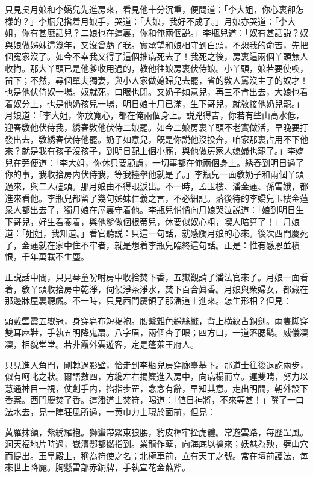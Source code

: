 只見吳月娘和李嬌兒先進房來，看見他十分沉重，便問道：「李大姐，你心裏卻怎樣的？」李瓶兒揝着月娘手，哭道：「大娘，我好不成了。」月娘亦哭道：「李大姐，你有甚麽話兒？二娘也在這裏，你和俺兩個説。」李瓶兒道：「奴有甚話説？奴與娘做姊妹這幾年，又沒曾虧了我。實承望和娘相守到白頭，不想我的命苦，先把個寃家沒了。如今不幸我又得了這個拙病死去了！我死之後，房裏這兩個丫頭無人收拘。那大丫頭已是他爹收用過的，教他往娘房裏伏侍娘。小丫頭，娘若要使喚，㽞下；不然，尋個單夫獨妻，與小人家做媳婦兒去罷，省的敎人罵沒主子的奴才！也是他伏侍奴一場。奴就死，口眼也閉。又奶子如意兒，再三不肯出去，大娘也看着奴分上，也是他奶孩兒一場，明日娘十月已滿，生下哥兒，就敎接他奶兒罷。」月娘道：「李大姐，你放寬心，都在俺兩個身上。説兇得吉，你若有些山高水低，迎春敎他伏侍我，綉春敎他伏侍二娘罷。如今二娘房裏丫頭不老實做活，早晚要打發出去，敎綉春伏侍他罷。奶子如意兒，旣是你説他沒投奔，咱家那裏占用不下他來？就是我有孩子沒孩子，到明日配上個小廝，與他做房家人媳婦也罷了。」李嬌兒在旁便道：「李大姐，你休只要顧慮，一切事都在俺兩個身上。綉春到明日過了你的事，我收拾房内伏侍我，等我擡擧他就是了。」李瓶兒一面敎奶子和兩個丫頭過來，與二人磕頭。那月娘由不得眼淚出。不一時，孟玉樓、潘金蓮、孫雪娥，都進來看他。李瓶兒都留了幾句姊妹仁義之言，不必細記。落後待的李嬌兒玉樓金蓮衆人都出去了，獨月娘在屋裏守着他。李瓶兒悄悄向月娘哭泣説道：「娘到明日生下哥兒，好生看養着，與他爹做個根蒂兒，休要似奴心粗，喫人暗算了！」月娘道：「姐姐，我知道。」看官聽説：只這一句話，就感觸月娘的心來。後次西門慶死了，金蓮就在家中住不牢者，就是想着李瓶兒臨終這句話。正是：惟有感恩並積恨，千年萬載不生塵。

正説話中間，只見琴童吩咐房中收拾焚下香，五嶽觀請了潘法官來了。月娘一面看着，敎丫頭收拾房中乾淨，伺候淨茶淨水，焚下百合眞香。月娘與衆婦女，都藏在那邊牀屋裏聽覷。不一時，只見西門慶領了那潘道士進來。怎生形相？但見：

\begin{myquote}
頭戴雲霞五嶽冠，身穿皂布短褐袍。腰繫雜色綵絲縧，背上横紋古銅劍。兩隻脚穿雙耳麻鞋，手執五明降鬼扇。八字眉，兩個杏子眼；四方口，一道落腮鬍。威儀凜凜，相貌堂堂。若非霞外雲遊客，定是蓬萊王府人。
\end{myquote}

只見進入角門，剛轉過影壁，恰走到李瓶兒房穿廊臺基下。那道士往後退訖兩步，似有呵叱之狀。爾語數四，方纔左右揭簾進入房中，向病榻而立。運雙睛，努力以慧通神目一視，仗劍手内，掐指步罡，念念有辭，早知其意。走出明間，朝外設下香案。西門慶焚了香。這潘道士焚符，喝道：「値日神將，不來等甚！」噀了一口法水去，見一陣狂風所過，一黄巾力士現於面前，但見：

\begin{myquote}
黄羅抹額，紫綉羅袍。獅蠻帶緊束狼腰，豹皮褌牢拴虎體。常遊雲路，每歷罡風。洞天福地片時過，嶽瀆酆都撚指到。業龍作孽，向海底以擒來；妖魅為殃，劈山穴而提出。玉皇殿上，稱為符使之名；北極車前，立有天丁之號。常在壇前護法，每來世上降魔。胸懸雷部赤銅牌，手執宣花金蘸斧。
\end{myquote}

